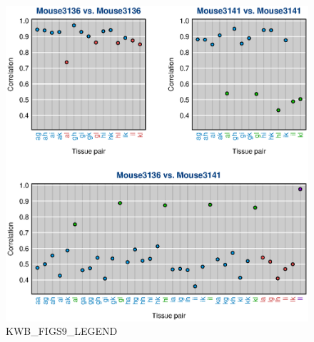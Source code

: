 \documentclass[letterpaper,twoside]{article}
\begin{document}
\begin{figure}[p]
\centerline{\includegraphics{SuppFigs/figS9.eps}}

\caption{KWB_FIGS9_LEGEND}
\end{figure}


\clearpage
\end{document}
